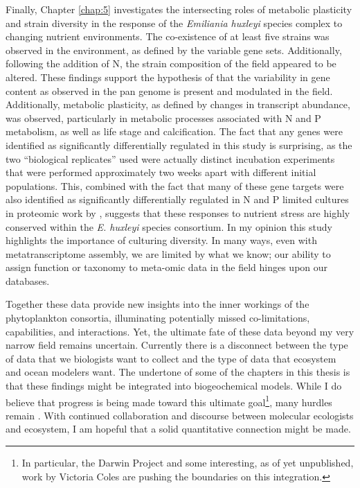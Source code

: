 Finally, Chapter \ref{chap:5} investigates the intersecting roles of metabolic plasticity and strain diversity in the response of the \textit{Emiliania huxleyi} species complex to changing nutrient environments. The co-existence of at least five strains was observed in the environment, as defined by the variable gene sets. Additionally, following the addition of N, the strain composition of the field appeared to be altered. These findings support the hypothesis of \citet{Read2013} that the variability in gene content as observed in the pan genome is present and modulated in the field. Additionally, metabolic plasticity, as defined by changes in transcript abundance, was observed, particularly in metabolic processes associated with N and P metabolism, as well as life stage and calcification. The fact that any genes were identified as significantly differentially regulated in this study is surprising, as the two ``biological replicates'' used were actually distinct incubation experiments that were performed approximately two weeks apart with different initial populations. This, combined with the fact that many of these gene targets were also identified as significantly differentially regulated in N and P limited cultures in proteomic work by \citet{McKew2015}, suggests that these responses to nutrient stress are highly conserved within the \textit{E. huxleyi} species consortium. In my opinion this study highlights the importance of culturing diversity. In many ways, even with metatranscriptome assembly, we are limited by what we know; our ability to assign function or taxonomy to meta-omic data in the field hinges upon our databases. 
\par

Together these data provide new insights into the inner workings of the phytoplankton consortia, illuminating potentially missed co-limitations, capabilities, and interactions. Yet, the ultimate fate of these data beyond my very narrow field remains uncertain. Currently there is a disconnect between the type of data that we biologists want to collect and the type of data that ecosystem and ocean modelers want. The undertone of some of the chapters in this thesis is that these findings might be integrated into biogeochemical models. While I do believe that progress is being made toward this ultimate goal\footnote{In particular, the Darwin Project \citep{Follows2007} and some interesting, as of yet unpublished, work by Victoria Coles are pushing the boundaries on this integration.}, many hurdles remain \citep{Hood2007, Worden2015}. With continued collaboration and discourse between molecular ecologists and ecosystem, I am hopeful that a solid quantitative connection might be made. 

